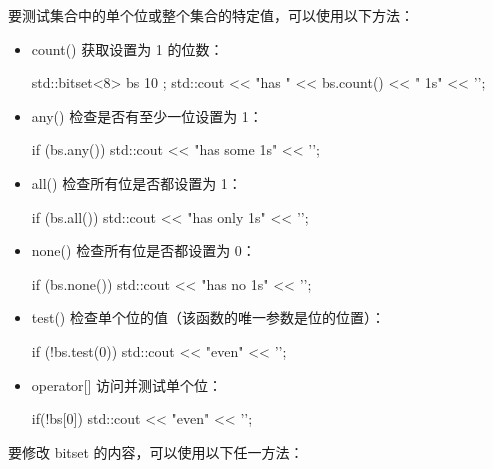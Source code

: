 要测试集合中的单个位或整个集合的特定值，可以使用以下方法：

\begin{itemize}
\item
count() 获取设置为 1 的位数：

\begin{cpp}
std::bitset<8> bs{ 10 };
std::cout << "has " << bs.count() << " 1s" << '\n';
\end{cpp}

\item
any() 检查是否有至少一位设置为 1：

\begin{cpp}
if (bs.any()) std::cout << "has some 1s" << '\n';
\end{cpp}

\item
all() 检查所有位是否都设置为 1：

\begin{cpp}
if (bs.all()) std::cout << "has only 1s" << '\n';
\end{cpp}

\item
none() 检查所有位是否都设置为 0：

\begin{cpp}
if (bs.none()) std::cout << "has no 1s" << '\n';
\end{cpp}

\item
test() 检查单个位的值（该函数的唯一参数是位的位置）：

\begin{cpp}
if (!bs.test(0)) std::cout << "even" << '\n';
\end{cpp}

\item
operator[] 访问并测试单个位：

\begin{cpp}
if(!bs[0]) std::cout << "even" << '\n';
\end{cpp}
\end{itemize}

要修改 bitset 的内容，可以使用以下任一方法：

